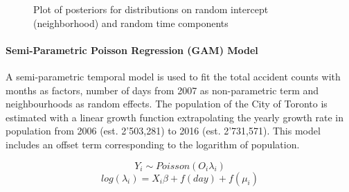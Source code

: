 \documentclass[]{article}
\let\oldparagraph\paragraph
\renewcommand{\paragraph}[1]{\oldparagraph{#1}\mbox{}}
\begin{document}
\begin{figure}[H]

{\centering {}

}

\caption{\label{fig:figs}Plot of posteriors for distributions on random intercept (neighborhood) and random time components}\label{fig:unnamed-chunk-12}
\end{figure}

\paragraph{Semi-Parametric Poisson Regression (GAM)
Model}\label{semi-parametric-poisson-regression-gam-model}

A semi-parametric temporal model is used to fit the total accident
counts with months as factors, number of days from 2007 as
non-parametric term and neighbourhoods as random effects. The population
of the City of Toronto is estimated with a linear growth function
extrapolating the yearly growth rate in population from 2006 (est.
2'503,281) to 2016 (est. 2'731,571). This model includes an offset term
corresponding to the logarithm of population.

\begin{equation}
Y_{i} \sim Poisson(O_{i}\lambda_{i})
\end{equation}\begin{equation}
log(\lambda_{i}) = X_{i}\beta + f(day) + f(\mu_{i})
\end{equation}
\end{document}
